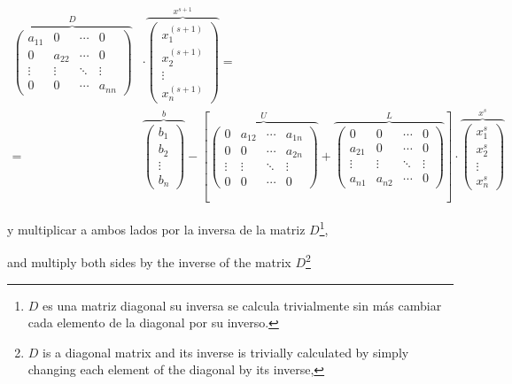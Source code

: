 \begin{align*}
\overbrace{\begin{pmatrix}
a_{11}& 0& \cdots & 0\\
0& a_{22}& \cdots & 0\\
\vdots & \vdots & \ddots & \vdots\\
0& 0& \cdots & a_{nn}
\end{pmatrix}}^D &\cdot \overbrace{\begin{pmatrix}
x_1^{(s+1)}\\
x_2^{(s+1)}\\
\vdots \\
x_n^{(s+1)}
\end{pmatrix}}^{x^{s+1}}=&\\
=&\overbrace{\begin{pmatrix}
b_1\\
b_2\\
\vdots \\
b_n
\end{pmatrix}}^b-\left[
\overbrace{\begin{pmatrix}
0& a_{12}& \cdots & a_{1n}\\
0& 0& \cdots & a_{2n}\\
\vdots & \vdots & \ddots & \vdots\\
0& 0& \cdots & 0
\end{pmatrix}}^U+
\overbrace{\begin{pmatrix}
0& 0& \cdots & 0\\
a_{21}& 0& \cdots & 0\\
\vdots & \vdots & \ddots & \vdots\\
a_{n1}& a_{n2}& \cdots & 0
\end{pmatrix}}^L \right] \cdot \overbrace{\begin{pmatrix}
x_1^s\\
x_2^s\\
\vdots \\
x_n^s
\end{pmatrix}}^{x^s}
\end{align*}

\begin{paracol}{2}
 y multiplicar a ambos lados por la inversa de la matriz $D$\footnote{$D$ es una matriz diagonal su inversa se calcula trivialmente sin más cambiar cada elemento de la diagonal por su inverso.},
 
\switchcolumn
 and multiply both sides by the inverse of the matrix $D$\footnote{$D$ is a diagonal matrix and its inverse is trivially calculated by simply changing each element of the diagonal by its inverse,}
 

\end{paracol}

